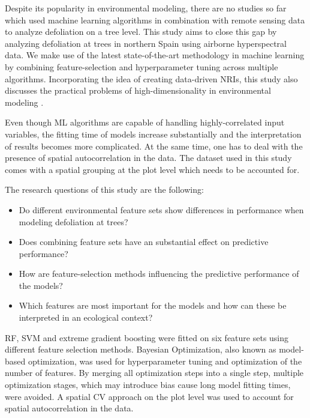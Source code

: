 \documentclass[letterpaper, peerreview]{IEEEtran}
\begin{document}

Despite its popularity in environmental modeling, there are no studies so far which used machine learning algorithms in combination with remote sensing data to analyze defoliation on a tree level.
This study aims to close this gap by analyzing defoliation at trees in northern Spain using airborne hyperspectral data.
We make use of the latest state-of-the-art methodology in machine learning by combining feature-selection and hyperparameter tuning across multiple algorithms.
Incorporating the idea of creating data-driven \ac{NRI}s, this study also discusses the practical problems of high-dimensionality in environmental modeling \cite{trunk1979, xu2016}.

Even though \ac{ML} algorithms are capable of handling highly-correlated input variables, the fitting time of models increase substantially and the interpretation of results becomes more complicated.
At the same time, one has to deal with the presence of spatial autocorrelation in the data.
The dataset used in this study comes with a spatial grouping at the plot level which needs to be accounted for.

The research questions of this study are the following:

\begin{itemize}

	\item Do different environmental feature sets show differences in performance when modeling defoliation at trees?
	      
	\item Does combining feature sets have an substantial effect on predictive performance?
	      
	\item How are feature-selection methods influencing the predictive performance of the models?
	      
	\item Which features are most important for the models and how can these be interpreted in an ecological context?
	      
\end{itemize}

\noindent \ac{RF}, \ac{SVM} and extreme gradient boosting were fitted on six feature sets using different feature selection methods.
Bayesian Optimization, also known as model-based optimization, was used for hyperparameter tuning and optimization of the number of features.
By merging all optimization steps into a single step, multiple optimization stages, which may introduce bias cause long model fitting times, were avoided.
A spatial \ac{CV} approach on the plot level was used to account for spatial autocorrelation in the data.
\end{document}
